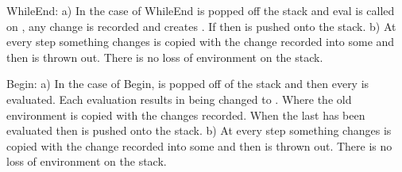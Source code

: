 \documentclass{book}
\begin{document}
\begin{mdP}[class={indent},data-line={169}]%
{}WhileEnd: a) In the case of WhileEnd %
{}\mdSpan[class={math-inline},elem={math-inline}]{$\rho$}%
{} is popped off the stack and eval is called 
on %
{}%
{}, any change is recorded and creates %
{}\mdSpan[class={math-inline},elem={math-inline}]{$\rho \prime$}%
{}. If %
{}%
{} then %
{}\mdSpan[class={math-inline},elem={math-inline}]{$\rho \prime$}%
{} is pushed onto the stack. b) At every step something changes %
{}\mdSpan[class={math-inline},elem={math-inline}]{$\rho$}%
{} is copied 
with the change recorded into some %
{}\mdSpan[class={math-inline},elem={math-inline}]{$\rho \prime$}%
{} and then %
{}\mdSpan[class={math-inline},elem={math-inline}]{$\rho$}%
{} is thrown out. There 
is no loss of environment on the stack.                                               %
{} %
{}%
\end{mdP}%
\begin{mdP}[class={indent},data-line={175}]%
{}Begin: a) In the case of Begin, %
{}\mdSpan[class={math-inline},elem={math-inline}]{$\rho$}%
{} is popped off of the stack and then every %
{}%
{} 
is evaluated. Each evaluation results in %
{}%
{} being changed to %
{}%
{}. 
Where the old environment is copied with the changes recorded. When the last %
{}%
{} has 
been evaluated then %
{}\mdSpan[class={math-inline},elem={math-inline}]{$\rho \prime$}%
{} is pushed onto the stack. b) At every step something 
changes %
{}\mdSpan[class={math-inline},elem={math-inline}]{$\rho$}%
{} is copied with the change recorded into some %
{}\mdSpan[class={math-inline},elem={math-inline}]{$\rho \prime$}%
{} and then 
{}\mdSpan[class={math-inline},elem={math-inline}]{$\rho$}%
{} is thrown out. There is no loss of environment on the stack.%
\end{mdP}%
\end{document}
